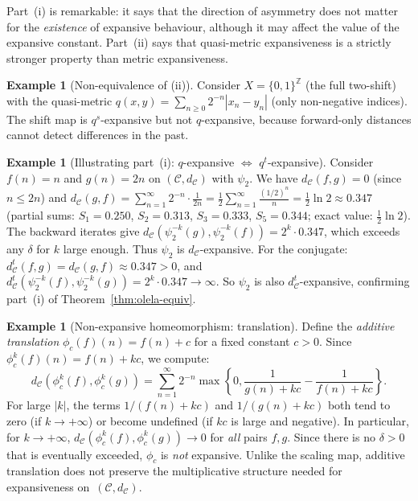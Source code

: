 \documentclass[11pt,a4paper]{article}
\theoremstyle{plain}
\theoremstyle{definition}
\newtheorem{exampleinner}[theoreminner]{Example}
\newenvironment{example}[1][]{\begin{exampleinner}[#1]}{\end{exampleinner}}
\newcommand{\Z}{\mathbb{Z}}
\newcommand{\C}{\mathcal{C}}
\begin{document}
Part~(i) is remarkable: it says that the direction of asymmetry does
not matter for the \emph{existence} of expansive behaviour, although
it may affect the value of the expansive constant.  Part~(ii) says
that quasi-metric expansiveness is a strictly stronger property than
metric expansiveness.

\begin{example}[Non-equivalence of (ii)]
\label{ex:converse-false}
Consider $X=\{0,1\}^\Z$ (the full two-shift) with the quasi-metric
$q(x,y)=\sum_{n\ge 0}2^{-n}|x_n-y_n|$ (only non-negative indices).
The shift map is $q^s$-expansive but not $q$-expansive, because
forward-only distances cannot detect differences in the past.
\end{example}

\begin{example}[Illustrating part~(i): $q$-expansive $\Leftrightarrow$ $q^t$-expansive]
\label{ex:q-qt-equiv}
Consider $f(n)=n$ and $g(n)=2n$ on $(\C,d_\C)$ with $\psi_2$.
We have $d_\C(f,g)=0$ (since $n\le 2n$) and
$d_\C(g,f)=\sum_{n=1}^\infty 2^{-n}\cdot\frac{1}{2n}
=\frac{1}{2}\sum_{n=1}^\infty\frac{(1/2)^n}{n}=\frac{1}{2}\ln 2
\approx 0.347$
(partial sums: $S_1=0.250$, $S_2=0.313$, $S_3=0.333$,
$S_5=0.344$; exact value: $\frac{1}{2}\ln 2$).
The backward iterates give $d_\C(\psi_2^{-k}(g),\psi_2^{-k}(f))
=2^k\cdot 0.347$, which exceeds any $\delta$ for $k$ large enough.
Thus $\psi_2$ is $d_\C$-expansive.  For the conjugate:
$d_\C^t(f,g)=d_\C(g,f)\approx 0.347>0$, and
$d_\C^t(\psi_2^{-k}(f),\psi_2^{-k}(g))=2^k\cdot 0.347\to\infty$.
So $\psi_2$ is also $d_\C^t$-expansive, confirming part~(i) of
Theorem~\ref{thm:olela-equiv}.
\end{example}

\begin{example}[Non-expansive homeomorphism: translation]
\label{ex:non-exp-translation}
Define the \emph{additive translation} $\phi_c(f)(n)=f(n)+c$ for a
fixed constant $c>0$.  Since $\phi_c^k(f)(n)=f(n)+kc$, we compute:
\[
  d_\C(\phi_c^k(f),\phi_c^k(g))
  = \sum_{n=1}^\infty 2^{-n}
    \max\!\left\{0,\frac{1}{g(n)+kc}-\frac{1}{f(n)+kc}\right\}.
\]
For large $|k|$, the terms $1/(f(n)+kc)$ and $1/(g(n)+kc)$ both
tend to zero (if $k\to+\infty$) or become undefined (if $kc$ is
large and negative).  In particular, for $k\to+\infty$,
$d_\C(\phi_c^k(f),\phi_c^k(g))\to 0$ for \emph{all} pairs $f,g$.
Since there is no $\delta>0$ that is eventually exceeded, $\phi_c$
is \emph{not} expansive.  Unlike the scaling map, additive
translation does not preserve the multiplicative structure needed
for expansiveness on~$(\C,d_\C)$.
\end{example}
\end{document}
